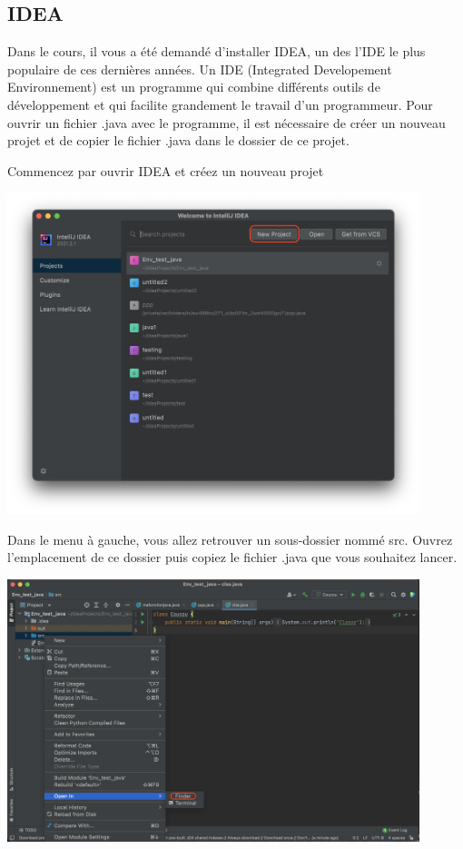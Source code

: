 \subsection{IDEA}

Dans le cours, il vous a été demandé d'installer IDEA, un des l'IDE le plus populaire de ces dernières années. Un IDE (Integrated Developement Environnement) est un programme qui combine différents outils de développement et qui facilite grandement le travail d'un programmeur. Pour ouvrir un fichier .java avec le programme, il est nécessaire de créer un nouveau projet et de copier le fichier .java dans le dossier de ce projet.

Commencez par ouvrir IDEA et créez un nouveau projet

\begin{center}
	\includegraphics[width=12cm]{np}	
\end{center}
 

Dans le menu à gauche, vous allez retrouver un sous-dossier nommé src. Ouvrez l'emplacement de ce dossier puis copiez le fichier .java que vous souhaitez lancer.

\begin{center}
	\includegraphics[width=12cm]{finder}	
\end{center}

